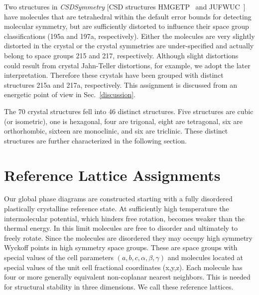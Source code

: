 \documentclass[preprint]{revtex4}              %
\begin{document}
Two structures in \emph{CSDSymmetry} [CSD structures
HMGETP~\cite{Dahl75} and JUFWUC~\cite{Tesh92}] have molecules that
are tetrahedral within the default error bounds for detecting
molecular symmetry, but are sufficiently distorted to influence
their space group classifications (195a and 197a, respectively).
Either the molecules are very slightly distorted in the crystal or
the crystal symmetries are under-specified and actually belong to
space groups 215 and 217, respectively. Although slight distortions
could result from crystal Jahn-Teller distortions, for example, we
adopt the later interpretation. Therefore these crystals have been
grouped with distinct structures 215a and 217a, respectively. This
assignment is discussed from an energetic point of view in
Sec.~\ref{discussion}.

The 70 crystal structures fell into 46 distinct structures. Five
structures are cubic (or isometric), one is hexagonal, four are
trigonal, eight are tetragonal, six are orthorhombic, sixteen are
monoclinic, and six are triclinic. These distinct structures are
further characterized in the following section.

\section{Reference Lattice Assignments}
\label{assignments}

Our global phase diagrams are constructed starting with a fully
disordered plastically crystalline reference state.  At sufficiently
high temperature the intermolecular potential, which hinders free
rotation, becomes weaker than the thermal energy.  In this limit
molecules are free to disorder and ultimately to freely rotate.
Since the molecules are disordered they may occupy high symmetry
Wyckoff points in high symmetry space groups. These are space groups
with special values of the cell parameters
$(a,b,c,\alpha,\beta,\gamma)$ and molecules located at special
values of the unit cell fractional coordinates (x,y,z). Each
molecule has four or more generally equivalent non-coplanar nearest
neighbors. This is needed for structural stability in three
dimensions. We call these reference lattices.
\end{document}
